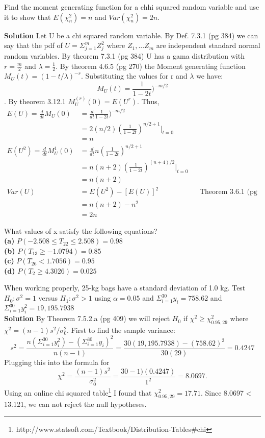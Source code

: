 \documentclass[12pt]{article}
\newenvironment{problem}[2][Problem]{\begin{trivlist}
\item[\hskip \labelsep {\bfseries #1}\hskip \labelsep {\bfseries #2.}]}{\end{trivlist}}
\begin{document}
\begin{problem}{7.3.2}Find the moment generating function for a chhi squared random variable and use it to show that $E(\chi^2_n) = n$ and $Var(\chi^2_n)=2n. $

\textbf{Solution}
Let U be a chi squared random variable. By Def. 7.3.1 (pg 384) we can say that the pdf of $U = \Sigma_{j=1}^m Z^2_j$ where $Z_1,...Z_m$ are independent standard normal random variables. By theorem 7.3.1 (pg 384) U has a gama distribution with $r=\frac{m}{2}$ and $\lambda = \frac{1}{2}$. By theorem 4.6.5 (pg 270) the Moment generating function $M_U(t) = (1-t/\lambda)^{-r}$. Substituting the values for r and $\lambda $ we have: 
$$ M_U(t) = \frac{1}{1-2t})^{-m/2} $$. 
By theorem 3.12.1 $M_U^{(r)}(0) = E(U^r)$. Thus, 
\begin{align*}
E(U) = \frac{d}{dt}M_U(0) &= \frac{d}{dt} \frac{1}{1-2t})^{-m/2} \\
	&= 2(n/2)(\frac{1}{1-2t})^{n/2+1}\Big|_{t=0} \\
	&= n \\ 
E(U^2) = \frac{d}{dt}M_U^1(0)& =  \frac{d}{dt}n(\frac{1}{1-2t})^{n/2+1} \\
	&= n(n+2)(\frac{1}{1-2t})^{(n+4)/2} \Big|_{t=0}\\
	&= n(n+2) \\
Var(U) &= E(U^2) - [E(U)]^2 &&\text{Theorem 3.6.1 (pg 155)} \\
&= n(n+2) - n^2 \\
&= 2n
\end{align*}
\end{problem} 

\begin{problem}{7.4.2} What values of x satisfy the following equations? \\
\textbf{(a)} $P(-2.508  \leq T_{22} \leq 2.508) = 0.98 $\\
\textbf{(b)} $P(T_{13} \geq -1.0794 ) = 0.85 $ \\
\textbf{(c)} $P(T_{26} < 1.7056) = 0.95 $ \\
\textbf{(d)} $P(T_2 \geq 4.3026) = 0.025 $ 
\end{problem}
\newpage 
\begin{problem}{7.5.16} When working properly, 25-kg bags have a standard deviation of 1.0 kg. Test $H_0: \sigma^2 = 1$ versus $H_1: \sigma^2 >1$ using $\alpha = 0.05$ and $\Sigma_{i=1}^{30}y_i = 758.62$ and $\Sigma_{i=1}^{30}y_i^2 = 19,195.7938$  \\
\textbf{Solution} By Theorem 7.5.2.a (pg 409) we will reject $H_0$ if $\chi^2 \geq \chi^2_{0.95,29}$ where $\chi^2 = (n-1)s^2/\sigma_0^2$. First to find the sample variance: 
$$ s^2 = \frac{n(\Sigma_{i=1}^{30}y_i^2) - (\Sigma_{i=1}^{30}y_i)^2}{n(n-1)} = \frac{30(19,195.7938)-(758.62)^2}{30(29)} = 0.4247 $$
Plugging this into the formula for 
$$ \chi^2 = \frac{(n-1)s^2}{\sigma_0^2} = \frac{30-1)(0.4247)}{1^2} = 8.0697. $$
Using an online chi squared table\footnote{http://www.statsoft.com/Textbook/Distribution-Tables\#chi} I found that $\chi^2_{0.95,29} = 17.71$. Since 8.0697 < 13.121, we can not reject the null hypotheses. 
\end{problem} 
\end{document}
